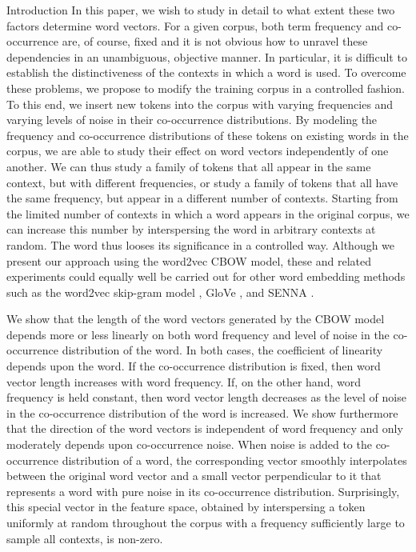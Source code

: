 \documentclass{article} %
\begin{document}
\begin{section}{Introduction}
In this paper, we wish to study in detail to what extent these two
factors determine word vectors.  For a given corpus, both term
frequency and co-occurrence are, of course, fixed and it is not obvious
how to unravel these dependencies in an unambiguous, objective manner.
In particular, it is difficult to establish the distinctiveness of the
contexts in which a word is used.  To overcome these problems, we
propose to modify the training corpus in a controlled fashion.  To
this end, we insert new tokens into the corpus with varying frequencies
and varying levels of noise in their co-occurrence distributions.  By
modeling the frequency and co-occurrence distributions of these tokens
on existing words in the corpus, we are able to study their effect on
word vectors independently of one another.  We can thus study a family
of tokens that all appear in the same context, but with different
frequencies, or study a family of tokens that all have the same
frequency, but appear in a different number of contexts.  Starting from
the limited number of contexts in which a word appears in the original
corpus, we can increase this number by interspersing the word in arbitrary
contexts at random.  The word thus looses its significance in a
controlled way.  Although we present our approach using the word2vec
CBOW model, these and related experiments could equally well be carried
out for other word embedding methods such as the word2vec skip-gram
model \cite{DistRepns,EfficientEstimation}, GloVe
\cite{pennington2014glove}, and SENNA \cite{collobert-2011}.

We show that the length of the word vectors generated by the CBOW model
depends more or less linearly on both word frequency and level of noise
in the co-occurrence distribution of the word.  In both cases, the
coefficient of linearity depends upon the word.  If the co-occurrence
distribution is fixed, then word vector length increases with word
frequency.  If, on the other hand, word frequency is held constant, then
word vector length decreases as the level of noise in the co-occurrence
distribution of the word is increased.  We show furthermore that the
direction of the word vectors is independent of word frequency and only
moderately depends upon co-occurrence noise.  When noise is added to the
co-occurrence distribution of a word, the corresponding vector smoothly
interpolates between the original word vector and a small vector
perpendicular to it that represents a word with pure noise in its
co-occurrence distribution.  Surprisingly, this special vector in the feature
space, obtained by interspersing a token uniformly at random throughout
the corpus with a frequency sufficiently large to sample all contexts, is
non-zero.


\end{section}
\end{document}
